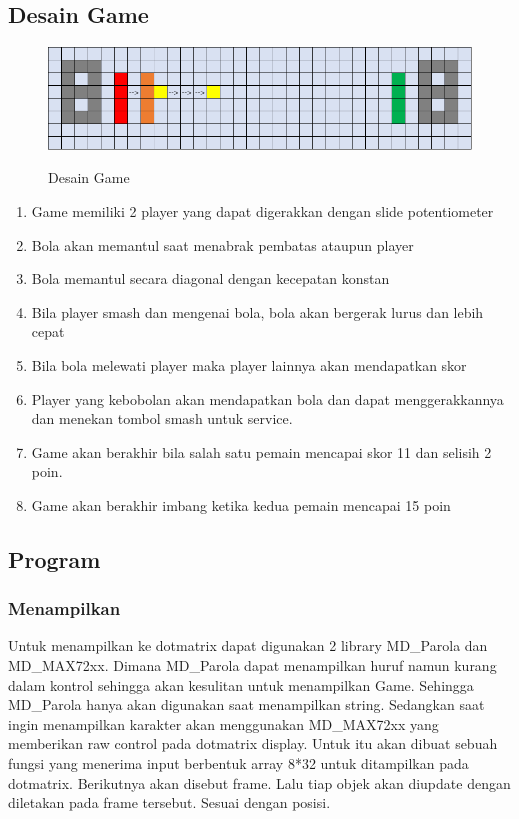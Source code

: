 \documentclass[a4paper,12pt]{article}
\begin{document}
\subsection{Desain Game}
\begin{figure}[h!]
    \centering
    \includegraphics[width=1\textwidth]{images/desain_game.png}
    \label{fig:desaingame}
    \caption{Desain Game}
\end{figure}
\begin{enumerate}
    \item Game memiliki 2 player yang dapat digerakkan dengan slide potentiometer
    \item Bola akan memantul saat menabrak pembatas ataupun player
    \item Bola memantul secara diagonal dengan kecepatan konstan
    \item Bila player smash dan mengenai bola, bola akan bergerak lurus dan lebih cepat
    \item Bila bola melewati player maka player lainnya akan mendapatkan skor
    \item Player yang kebobolan akan mendapatkan bola dan dapat menggerakkannya
        dan menekan tombol smash untuk service.
    \item Game akan berakhir bila salah satu pemain mencapai skor 11 dan selisih 2 poin.
    \item Game akan berakhir imbang ketika kedua pemain mencapai 15 poin
\end{enumerate}

\subsection{Program}
\subsubsection{Menampilkan}
Untuk menampilkan ke dotmatrix dapat digunakan 2 library MD\_Parola dan MD\_MAX72xx. Dimana MD\_Parola dapat
menampilkan huruf namun kurang dalam kontrol sehingga akan kesulitan untuk menampilkan Game. Sehingga MD\_Parola hanya akan digunakan
saat menampilkan string. Sedangkan saat ingin menampilkan karakter akan menggunakan MD\_MAX72xx yang memberikan raw control pada
dotmatrix display. Untuk itu akan dibuat sebuah fungsi yang menerima input berbentuk array 8*32 untuk ditampilkan pada dotmatrix. Berikutnya
akan disebut frame. Lalu tiap objek akan diupdate dengan diletakan pada frame tersebut. Sesuai dengan posisi.
\end{document}
